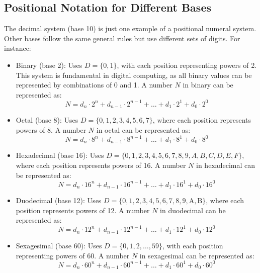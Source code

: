 \subsection{Positional Notation for Different Bases}
The decimal system (base 10) is just one example of a positional numeral system. Other bases follow the same general rules but use different sets of digits. For instance:
\begin{itemize}
    \item Binary (base 2): Uses \( D = \{0, 1\} \), with each position representing powers of 2. This system is fundamental in digital computing, as all binary values can be represented by combinations of 0 and 1. A number \( N \) in binary can be represented as:
    \[
    N = d_n \cdot 2^n + d_{n-1} \cdot 2^{n-1} + \ldots + d_1 \cdot 2^1 + d_0 \cdot 2^0
    \]

    \item Octal (base 8): Uses \( D = \{0, 1, 2, 3, 4, 5, 6, 7\} \), where each position represents powers of 8. A number \( N \) in octal can be represented as:
    \[
    N = d_n \cdot 8^n + d_{n-1} \cdot 8^{n-1} + \ldots + d_1 \cdot 8^1 + d_0 \cdot 8^0
    \]

    \item Hexadecimal (base 16): Uses \( D = \{0, 1, 2, 3, 4, 5, 6, 7, 8, 9, A, B, C, D, E, F\} \), where each position represents powers of 16. A number \( N \) in hexadecimal can be represented as:
    \[
    N = d_n \cdot 16^n + d_{n-1} \cdot 16^{n-1} + \ldots + d_1 \cdot 16^1 + d_0 \cdot 16^0
    \]

    \item Duodecimal (base 12): Uses \( D = \{0, 1, 2, 3, 4, 5, 6, 7, 8, 9, \text{A}, \text{B}\} \), where each position represents powers of 12. A number \( N \) in duodecimal can be represented as:
    \[
    N = d_n \cdot 12^n + d_{n-1} \cdot 12^{n-1} + \ldots + d_1 \cdot 12^1 + d_0 \cdot 12^0
    \]

    \item Sexagesimal (base 60): Uses \( D = \{0, 1, 2, \ldots, 59\} \), with each position representing powers of 60. A number \( N \) in sexagesimal can be represented as:
    \[
    N = d_n \cdot 60^n + d_{n-1} \cdot 60^{n-1} + \ldots + d_1 \cdot 60^1 + d_0 \cdot 60^0
    \]
\end{itemize}



